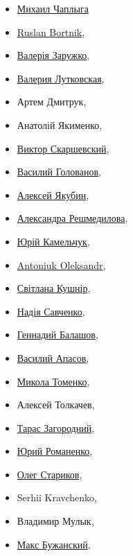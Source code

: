 \begin{multicols}{3}
\begin{itemize}
  \item \href{https://www.facebook.com/MikhailChaplyga}{Михаил Чаплыга}
  \item \href{https://www.facebook.com/ruslan.bortnik.3}{Ruslan Bortnik}, 
  \item \href{https://www.facebook.com/Zaruzhko.public}{Валерія Заружко},
  \item \href{https://www.facebook.com/vlutkovska}{Валерия Лутковская}, 
  \item Артем Дмитрук, 
  \item Анатолій Якименко, 
  \item \href{https://www.facebook.com/Viktor.Skarshevsky}{Виктор Скаршевский}, 
  \item \href{https://www.facebook.com/golovanov.vasiliy}{Василий Голованов},
  \item \href{https://www.facebook.com/profile.php?id=1352542874}{Алексей Якубин}, 
  \item \href{https://www.facebook.com/aleksandra.reshmedilova}{Александра Решмедилова}, 
  \item \href{https://www.facebook.com/yuriy.kamelchuk}{Юрій Камельчук}, 
  \item \href{https://www.facebook.com/oleks.antonyuk}{Antoniuk Oleksandr},
  \item \href{https://www.facebook.com/svitlana.kusnir}{Світлана Кушнір}, 
  \item \href{https://www.facebook.com/Savchenko.Nadiia}{Надія Савченко}, 
  \item \href{https://www.facebook.com/balashov.gennadiy}{Геннадий Балашов}, 
  \item \href{https://www.facebook.com/vasiliyapasoff}{Василий Апасов}, 
  \item \href{https://www.facebook.com/m.tomenko}{Микола Томенко}, 
  \item Алексей Толкачев, 
  \item \href{https://www.facebook.com/taras.zahorodniy}{Тарас Загородний}, 
  \item \href{https://www.facebook.com/yuriy.romanenko}{Юрий Романенко}, 
  \item \href{https://www.facebook.com/profile.php?id=100002892984274}{Олег Стариков},
  \item Serhii Kravchenko,
  \item Владимир Мулык, 
  \item \href{https://www.facebook.com/profile.php?id=100004634650264}{Макс Бужанский}, 

\end{itemize}
\end{multicols}
